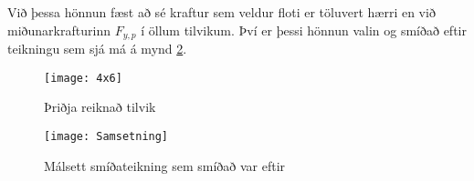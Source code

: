 Við þessa hönnun fæst að sé kraftur sem veldur floti er töluvert hærri en við miðunarkrafturinn $F_{y,p}$ í öllum tilvikum. Því er þessi hönnun valin og smíðað eftir teikningu sem sjá má á mynd \ref{fig::smidamynd}.


\begin{figure}
	\centering
	\texttt{[image: 4x6]}
	\caption{Þriðja reiknað tilvik}
	\label{fig::4x6}
\end{figure}

\begin{figure}
	\centering
	\texttt{[image: Samsetning]}
	\caption{Málsett smíðateikning sem smíðað var eftir}
	\label{fig::smidamynd}
\end{figure}